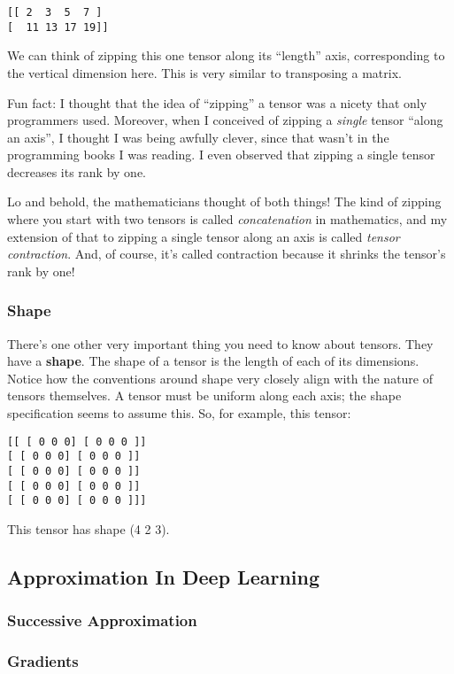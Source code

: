\documentclass[11pt]{article}
\begin{document}
\begin{verbatim}
[[ 2  3  5  7 ]
[  11 13 17 19]]
\end{verbatim}

We can think of zipping this one tensor along its ``length'' axis, corresponding to the vertical dimension here. This is very similar to transposing a matrix.

Fun fact: I thought that the idea of ``zipping'' a tensor was a nicety that only programmers used. Moreover, when I conceived of zipping a \emph{single} tensor ``along an axis'', I thought I was being awfully clever, since that wasn't in the programming books I was reading. I even observed that zipping a single tensor decreases its rank by one.

Lo and behold, the mathematicians thought of both things! The kind of zipping where you start with two tensors is called \emph{concatenation} in mathematics, and my extension of that to zipping a single tensor along an axis is called \emph{tensor contraction}. And, of course, it's called contraction because it shrinks the tensor's rank by one!
\subsubsection{Shape}
\label{sec:orgc82d39e}
There's one other very important thing you need to know about tensors. They have a \textbf{shape}. The shape of a tensor is the length of each of its dimensions. Notice how the conventions around shape very closely align with the nature of tensors themselves. A tensor must be uniform along each axis; the shape specification seems to assume this. So, for example, this tensor:

\begin{verbatim}
[[ [ 0 0 0] [ 0 0 0 ]]
[ [ 0 0 0] [ 0 0 0 ]]
[ [ 0 0 0] [ 0 0 0 ]]
[ [ 0 0 0] [ 0 0 0 ]]
[ [ 0 0 0] [ 0 0 0 ]]]
\end{verbatim}

This tensor has shape (4 2 3).
\subsection{Approximation In Deep Learning}
\label{sec:org2aede24}
\subsubsection{Successive Approximation}
\label{sec:org5067fab}
\subsubsection{Gradients}
\label{sec:org2f7f609}
\end{document}
